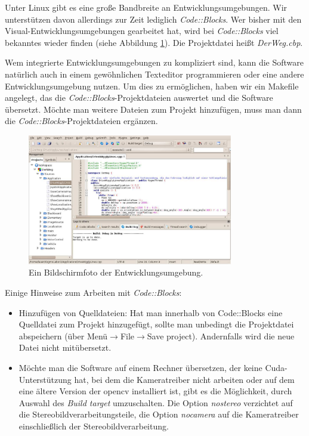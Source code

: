 \documentclass[a4paper, 11pt]{article}
\begin{document}
{Unter Linux gibt es eine große Bandbreite an Entwicklungsumgebungen. Wir unterstützen davon allerdings zur Zeit lediglich \textit{Code::Blocks}. Wer bisher mit den Visual-Entwicklungsumgebungen gearbeitet hat, wird bei \textit{Code::Blocks} viel bekanntes wieder finden (siehe Abbildung \ref{fig:codeblockssnapshot}). Die Projektdatei heißt \textit{DerWeg.cbp}.

Wem integrierte Entwicklungsumgebungen zu kompliziert sind, kann die Software natürlich auch in einem gewöhnlichen Texteditor programmieren oder eine andere Entwicklungsumgebung nutzen. Um dies zu ermöglichen, haben wir ein Makefile angelegt, das die \textit{Code::Blocks}-Projektdateien auswertet und die Software übersetzt. Möchte man weitere Dateien zum Projekt hinzufügen, muss man dann die \textit{Code::Blocks}-Projektdateien ergänzen.

\begin{figure}
\centering
\includegraphics[width=0.8\textwidth]{codeblockssnapshot}
\caption{Ein Bildschirmfoto der Entwicklungsumgebung.}
\label{fig:codeblockssnapshot}
\end{figure}

Einige Hinweise zum Arbeiten mit \textit{Code::Blocks}: 
\begin{itemize}
\item Hinzufügen von Quelldateien: Hat man innerhalb von Code::Blocks eine Quelldatei zum Projekt hinzugefügt, sollte man unbedingt die Projektdatei abspeichern (über Menü$\rightarrow$File$\rightarrow$Save project). Andernfalls wird die neue Datei nicht mitübersetzt.
\item Möchte man die Software auf einem Rechner übersetzen, der keine Cuda-Unterstützung hat, bei dem die Kameratreiber nicht arbeiten oder auf dem eine ältere Version der opencv installiert ist, gibt es die Möglichkeit, durch Auswahl des \textit{Build target} umzuschalten. Die Option \textit{nostereo} verzichtet auf die Stereobildverarbeitungsteile, die Option \textit{nocamera} auf die Kameratreiber einschließlich der Stereobildverarbeitung.
\end{itemize}

}
\end{document}
